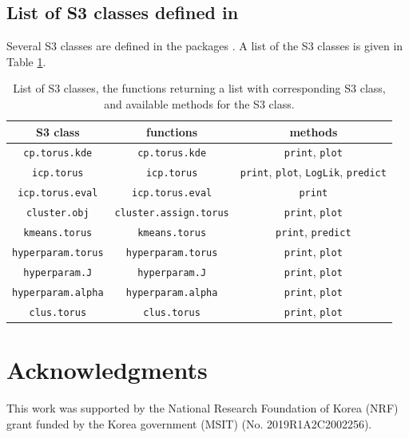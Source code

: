 \subsection{List of S3 classes defined in }

 Several S3 classes are defined in the packages . A list of the S3 classes is given in Table \ref{tab:listS3}.

\renewcommand{\arraystretch}{1.1}
\begin{table}[hbt!]
\small
\centering
\begin{tabularx}{0.8\textwidth}{c|cc}
\toprule
S3 class &  functions & methods \\ \hline
                \texttt{cp.torus.kde} & \texttt{cp.torus.kde} & \texttt{print}, \texttt{plot} \\
                \texttt{icp.torus} & \texttt{icp.torus} & \texttt{print}, \texttt{plot}, \texttt{LogLik}, \texttt{predict}\\
                \texttt{icp.torus.eval} & \texttt{icp.torus.eval} & \texttt{print}\\
                \texttt{cluster.obj} & \texttt{cluster.assign.torus} & \texttt{print}, \texttt{plot}\\
                 \texttt{kmeans.torus} & \texttt{kmeans.torus} & \texttt{print}, \texttt{predict}\\
                 \texttt{hyperparam.torus} & \texttt{hyperparam.torus} & \texttt{print}, \texttt{plot}\\
                 \texttt{hyperparam.J} & \texttt{hyperparam.J} & \texttt{print}, \texttt{plot}\\
                 \texttt{hyperparam.alpha} & \texttt{hyperparam.alpha} & \texttt{print}, \texttt{plot}\\
                 \texttt{clus.torus} & \texttt{clus.torus} & \texttt{print}, \texttt{plot}\\
\bottomrule
\end{tabularx}
            \caption{List of S3 classes, the functions returning a list with corresponding S3 class, and available methods for the S3 class.}
            \label{tab:listS3}
\end{table}
 


\section{Acknowledgments}
This work was supported by the National Research Foundation of Korea (NRF) grant funded by the Korea government (MSIT) (No. 2019R1A2C2002256).

